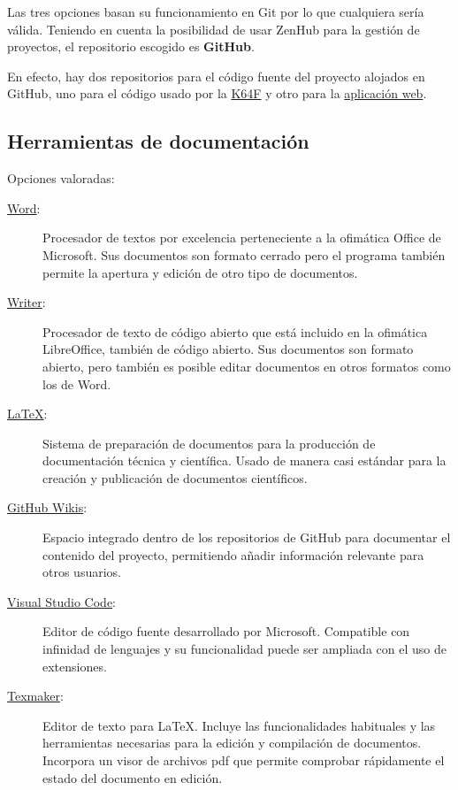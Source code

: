 Las tres opciones basan su funcionamiento en Git por lo que cualquiera sería
válida. Teniendo en cuenta la posibilidad de usar ZenHub para la gestión de
proyectos, el repositorio escogido es \textbf{GitHub}.

En efecto, hay dos repositorios para el código fuente del proyecto alojados en 
GitHub, uno para el código usado por la
\href{https://github.com/rpc0027/k64f-lwip}{K64F} y otro para la
\href{https://github.com/rpc0027/web-app}{aplicación web}.

\subsection{Herramientas de documentación}{\label{sec:docs}}
Opciones valoradas:
\begin{description}
  \item[\href{https://products.office.com/es-es/word}{Word}:] Procesador de
  textos por excelencia perteneciente a la  ofimática
  Office de Microsoft. Sus documentos son formato cerrado pero el programa
  también permite la apertura y edición de otro tipo de documentos.
  \item[\href{https://es.libreoffice.org/descubre/writer/}{Writer}:] Procesador
  de texto de código abierto que está incluido en la 
  ofimática LibreOffice, también de código abierto. Sus documentos son formato
  abierto, pero también es posible editar documentos en otros formatos como los
  de Word.
  \item[\href{https://www.latex-project.org/}{\LaTeX}:] Sistema de preparación de
  documentos para la producción de documentación técnica y científica. Usado de
  manera casi estándar para la creación y publicación de documentos científicos.
  \item[\href{https://help.github.com/articles/about-wikis/}{GitHub Wikis}:] 
  Espacio integrado dentro de los repositorios de GitHub para documentar el
  contenido del proyecto, permitiendo añadir información relevante para otros
  usuarios.
  \item[\href{https://code.visualstudio.com/}{Visual Studio Code}:] Editor de
   código fuente desarrollado por Microsoft. Compatible con infinidad de
   lenguajes y su funcionalidad puede ser ampliada con el uso de extensiones.
  \item[\href{http://www.xm1math.net/texmaker/}{Texmaker}:] Editor de texto
  para \LaTeX. Incluye las funcionalidades habituales y las herramientas
  necesarias para la edición y compilación de documentos. Incorpora un visor
  de archivos pdf que permite comprobar rápidamente el estado del documento en
  edición.
\end{description}

